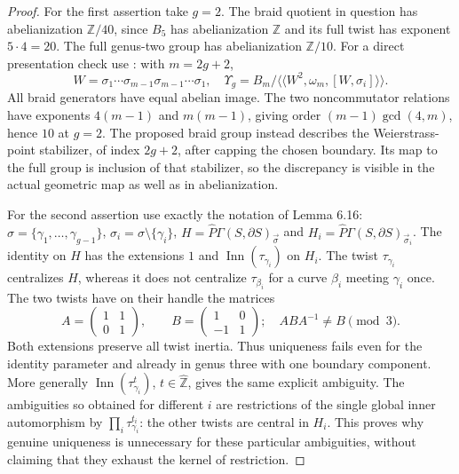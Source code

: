 \begin{proof}
For the first assertion take $g=2$.  The braid quotient in
question has abelianization $\mathbb Z/40$, since $B_5$ has
abelianization $\mathbb Z$ and its full twist has exponent
$5\cdot4=20$.  The full genus-two group has abelianization
$\mathbb Z/10$.  For a direct presentation check use
\cite[Example 4.1, p.~194]{ET_CW2007}: with $m=2g+2$,
\[
 W=\sigma _1\cdots\sigma _{m-1}\sigma _{m-1}\cdots\sigma _1,
 \quad
 \Upsilon_g=B_m/\langle\!\langle W^2,\omega_m,
                                      [W,\sigma_i]\rangle\!\rangle.
                                                               \tag{E.27}
\]
All braid generators have equal abelian image.  The two
noncommutator relations have exponents $4(m-1)$ and
$m(m-1)$, giving order $(m-1)\gcd(4,m)$, hence $10$ at
$g=2$.  The proposed braid group instead describes the
Weierstrass-point stabilizer, of index $2g+2$, after capping
the chosen boundary.  Its map to the full group is inclusion
of that stabilizer, so the discrepancy is visible in the
actual geometric map as well as in abelianization.

For the second assertion use exactly the notation of Lemma
6.16: $\sigma=\{\gamma_1,\ldots,\gamma_{g-1}\}$,
$\sigma_i=\sigma\setminus\{\gamma_i\}$,
$H=\widehat P\Gamma(S,\partial S)_{\vec\sigma}$ and
$H_i=\widehat P\Gamma(S,\partial S)_{\vec\sigma_i}$.
The identity on $H$ has the extensions
$1$ and $\operatorname{Inn}(\tau_{\gamma_i})$ on $H_i$.
The twist $\tau_{\gamma_i}$ centralizes $H$, whereas it does
not centralize $\tau_{\beta_i}$ for a curve $\beta_i$ meeting
$\gamma_i$ once.  The two twists have on their handle the
matrices
\[
 A=\begin{pmatrix}1&1\\0&1\end{pmatrix},\qquad
 B=\begin{pmatrix}1&0\\-1&1\end{pmatrix};
 \quad ABA^{-1}\ne B\pmod3.
\]
Both extensions preserve all twist inertia.  Thus uniqueness
fails even for the identity parameter and already in genus
three with one boundary component.  More generally
$\operatorname{Inn}(\tau_{\gamma_i}^t)$, $t\in\widehat{\mathbb Z}$,
gives the same explicit ambiguity.  The ambiguities so obtained
for different $i$ are restrictions of the single global
inner automorphism by $\prod_i\tau_{\gamma_i}^{t_i}$:
the other twists are central in $H_i$.
This proves why genuine uniqueness is unnecessary for these
particular ambiguities, without claiming that they exhaust
the kernel of restriction.


\end{proof}
